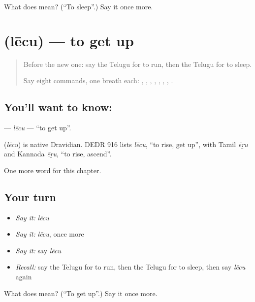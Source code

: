 \begin{tcolorbox}[breakable,colback=teal!4,colframe=teal!35!black,title={Before you move on}]
What does  mean? (\textquotedblleft{}To sleep\textquotedblright{}.) Say it once more.
\end{tcolorbox}
\section[\texorpdfstring{\te{లేచు} (lēcu)}{లేచు (lēcu)}]{ (lēcu) — to get up}

\label{lesson:TE-C143-lecu}



\begin{quote}
Before the new one: say the Telugu for to run, then the Telugu for to sleep.

Say eight commands, one breath each: \textbf{}, \textbf{}, \textbf{}, \textbf{}, \textbf{}, \textbf{}, \textbf{}, \textbf{}.
\end{quote}

\subsection*{You'll want to know: }
\textbf{} — \emph{lēcu} — \textquotedblleft{}to get up\textquotedblright{}.

\begin{cousinweb}
\textbf{} (\emph{lēcu}) is native Dravidian. DEDR 916 lists \emph{lēcu}, \textquotedblleft{}to rise, get up\textquotedblright{}, with Tamil \emph{ēṟu} and Kannada \emph{ēṟu}, \textquotedblleft{}to rise, ascend\textquotedblright{}.
\end{cousinweb}

\begin{grammarlens}[title={What you've built}]
One more word for this chapter.
\end{grammarlens}

\subsection*{Your turn}
\begin{itemize}
\raggedright
  \item \emph{Say it:} \emph{lēcu}
  \item \emph{Say it:} \emph{lēcu}, once more
  \item \emph{Say it:} say \emph{lēcu}
  \item \emph{Recall:} say the Telugu for to run, then the Telugu for to sleep, then say \emph{lēcu} again
\end{itemize}

\begin{tcolorbox}[breakable,colback=teal!4,colframe=teal!35!black,title={Before you move on}]
What does  mean? (\textquotedblleft{}To get up\textquotedblright{}.) Say it once more.
\end{tcolorbox}
